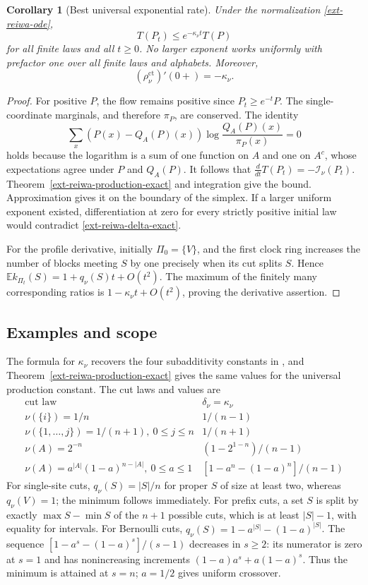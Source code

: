 \documentclass[11pt,a4paper]{article}
\newtheorem{corollary}[theorem]{Corollary}
\theoremstyle{definition}\newtheorem{definition}[theorem]{Definition}
\theoremstyle{remark}\newtheorem{remark}[theorem]{Remark}
\numberwithin{equation}{section}
\begin{document}
\begin{corollary}[Best universal exponential rate]
\label{ext-reiwa-exponential}
Under the normalization \eqref{ext-reiwa-ode},
\[
 T(P_t)\leq e^{-\kappa_\nu t}T(P)
\]
for all finite laws and all $t\geq0$.  No larger exponent works
uniformly with prefactor one over all finite laws and alphabets.
Moreover,
\[
 (\rho_{\nu}^{\mathrm{ct}})'(0+)=-\kappa_\nu.
\]
\end{corollary}
\begin{proof}
For positive $P$, the flow remains positive since $P_t\geq e^{-t}P$.
The single-coordinate marginals, and therefore $\pi_P$, are conserved.
The identity
\[
 \sum_x(P(x)-Q_A(P)(x))\log\frac{Q_A(P)(x)}{\pi_P(x)}=0
\]
holds because the logarithm is a sum of one function on $A$ and one
on $A^c$, whose expectations agree under $P$ and $Q_A(P)$.
It follows that
$\frac{d}{dt}T(P_t)=-\mathcal I_\nu(P_t)$.
Theorem~\ref{ext-reiwa-production-exact} and integration give the
bound.  Approximation gives it on the boundary of the simplex.
If a larger uniform exponent existed, differentiation at zero for
every strictly positive initial law would contradict
\eqref{ext-reiwa-delta-exact}.

For the profile derivative, initially $\Pi_0=\{V\}$, and the first
clock ring increases the number of blocks meeting $S$ by one precisely
when its cut splits $S$.  Hence
$\mathbb E k_{\Pi_t}(S)=1+q_\nu(S)t+O(t^2)$.
The maximum of the finitely many corresponding ratios is
$1-\kappa_\nu t+O(t^2)$, proving the derivative assertion.
\end{proof}

\subsection{Examples and scope}

The formula for $\kappa_\nu$ recovers the four subadditivity constants
in \cite{ext-reiwa-CS}, and
Theorem~\ref{ext-reiwa-production-exact} gives the same values for the
universal production constant.  The cut laws and values are
\[
\begin{array}{c|c}
 \text{cut law}&\delta_\nu=\kappa_\nu\\ \hline
 \nu(\{i\})=1/n&1/(n-1)\\
 \nu(\{1,\ldots,j\})=1/(n+1),\ 0\leq j\leq n&1/(n+1)\\
 \nu(A)=2^{-n}&(1-2^{1-n})/(n-1)\\
 \nu(A)=a^{|A|}(1-a)^{n-|A|},\ 0\leq a\leq1
       &[1-a^n-(1-a)^n]/(n-1)
\end{array}
\]
For single-site cuts, $q_\nu(S)=|S|/n$ for proper $S$ of size at
least two, whereas $q_\nu(V)=1$; the minimum follows immediately.
For prefix cuts, a set $S$ is split by exactly
$\max S-\min S$ of the $n+1$ possible cuts, which is at least
$|S|-1$, with equality for intervals.  For Bernoulli cuts,
$q_\nu(S)=1-a^{|S|}-(1-a)^{|S|}$.  The sequence
$[1-a^s-(1-a)^s]/(s-1)$ decreases in $s\geq2$: its numerator is zero
at $s=1$ and has nonincreasing increments
$(1-a)a^s+a(1-a)^s$.  Thus the minimum is attained at $s=n$;
$a=1/2$ gives uniform crossover.
\end{document}
